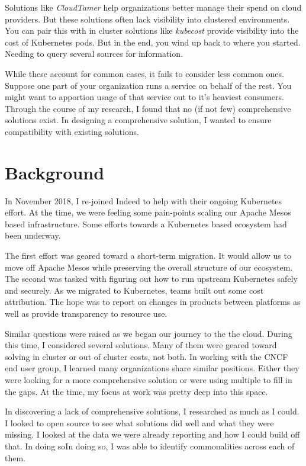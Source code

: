 \documentclass[10pt, a4paper, twocolumn]{article}
\begin{document}
  Solutions like \textit{CloudTamer} help organizations better manage their spend on cloud providers.
  But these solutions often lack visibility into clustered environments.
  You can pair this with in cluster solutions like \textit{kubecost} provide visibility into the cost of Kubernetes pods.
  But in the end, you wind up back to where you started.
  Needing to query several sources for information.

  While these account for common cases, it fails to consider less common ones.
  Suppose one part of your organization runs a service on behalf of the rest.
  You might want to apportion usage of that service out to it's heaviest consumers.
  Through the course of my research, I found that no (if not few) comprehensive solutions exist.
  In designing a comprehensive solution, I wanted to ensure compatibility with existing solutions.


\section*{Background}
  In November 2018, I re-joined Indeed to help with their ongoing Kubernetes effort.
  At the time, we were feeling some pain-points scaling our Apache Mesos based infrastructure.
  Some efforts towards a Kubernetes based ecosystem had been underway.

  The first effort was geared toward a short-term migration.
  It would allow us to move off Apache Mesos while preserving the overall structure of our ecosystem.
  The second was tasked with figuring out how to run upstream Kubernetes safely and securely.
  As we migrated to Kubernetes, teams built out some cost attribution.
  The hope was to report on changes in products between platforms as well as provide transparency to resource use.

  Similar questions were raised as we began our journey to the the cloud.
  During this time, I considered several solutions.
  Many of them were geared toward solving in cluster or out of cluster costs, not both.
  In working with the CNCF end user group, I learned many organizations share similar positions.
  Either they were looking for a more comprehensive solution or were using multiple to fill in the gaps.
  At the time, my focus at work was pretty deep into this space.

  In discovering a lack of comprehensive solutions, I researched as much as I could.
  I looked to open source to see what solutions did well and what they were missing.
  I looked at the data we were already reporting and how I could build off that.
  In doing soIn doing so, I was able to identify commonalities across each of them.
\end{document}
